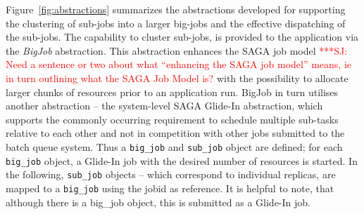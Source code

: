 \documentclass{rspublic}
\newcommand{\alnote}[1]{ {\textcolor{blue} { ***AL: #1 }}}
\newcommand{\jhanote}[1]{ {\textcolor{red} { ***SJ: #1 }}}
\newcommand{\alnote}[1]{}
\newcommand{\jhanote}[1]{}
\begin{document}
Figure~\ref{fig:abstractions} summarizes the abstractions developed
for supporting the clustering of sub-jobs into a larger big-jobs and
the effective dispatching of the sub-jobs.  The capability to cluster
sub-jobs, is provided to the application via the \emph{BigJob}
abstraction. This abstraction enhances the SAGA job model
\jhanote{Need a sentence or two about what ``enhancing the SAGA job
  model'' means, ie in turn outlining what the SAGA Job Model is?}
with the possibility to allocate larger chunks of resources prior to
an application run.  BigJob in turn utilises another abstraction --
the system-level SAGA Glide-In abstraction, which supports the
commonly occurring requirement to schedule multiple sub-tasks relative
to each other and not in competition with other jobs submitted to the
batch queue system.  Thus a \texttt{big\_job} and \texttt{sub\_job}
object are defined; for each \texttt{big\_job} object, a Glide-In job
with the desired number of resources is started. In the following,
\texttt{sub\_job} objects -- which correspond to individual replicas,
are mapped to a \texttt{big\_job} using the jobid as reference. It is
helpful to note, that although there is a big\_job object, this is
submitted as a Glide-In job.




%
%
   
\end{document}
